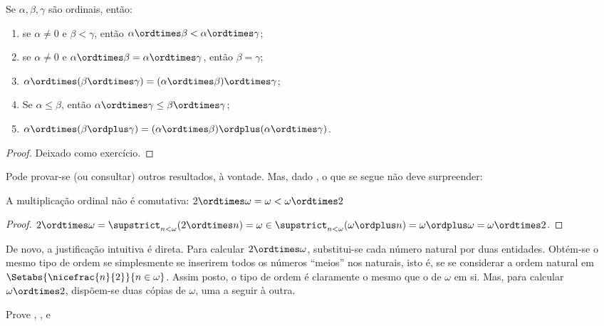 \documentclass[../../../include/open-logic-section]{subfiles}
\begin{document}
\begin{lem}
Se $\alpha, \beta, \gamma$ são ordinais, então:
\begin{enumerate}
	\item{} se $\alpha \neq 0$ e $\beta < \gamma$,
	então $\alpha \ordtimes \beta < \alpha \ordtimes \gamma$;
	\item{} se $\alpha \neq 0$ e $\alpha \ordtimes
	\beta = \alpha\ordtimes\gamma$, então $\beta = \gamma$;
	\item{}  $\alpha \ordtimes (\beta \ordtimes
	\gamma) = (\alpha \ordtimes \beta) \ordtimes \gamma$;
	\item{}  Se $\alpha \leq \beta$, então $\alpha
	\ordtimes \gamma \leq \beta \ordtimes \gamma$;
	\item{}  $\alpha \ordtimes (\beta \ordplus
	\gamma) = (\alpha \ordtimes \beta )\ordplus (\alpha\ordtimes
	\gamma)$.
\end{enumerate}
\end{lem}

\begin{proof}
Deixado como exercício.
\end{proof}

Pode provar-se (ou consultar) outros resultados, à vontade.
Mas, dado
, o
que se segue não deve surpreender:

\begin{prop}
A multiplicação ordinal não é comutativa: $2 \ordtimes \omega  =
\omega < \omega \ordtimes 2$
\end{prop}

\begin{proof}
$2 \ordtimes \omega = \supstrict_{n < \omega}(2\ordtimes  n) = \omega \in \supstrict_{n < \omega}(\omega \ordplus n) = \omega \ordplus \omega = \omega \ordtimes 2$.
\end{proof}
\noindent
De novo, a justificação intuitiva é direta. Para calcular $2
\ordtimes \omega$, substitui-se cada número natural por duas entidades.
Obtém-se o mesmo tipo de ordem se simplesmente se inserirem todos os
números ``meios'' nos naturais, isto é, se se considerar a
ordem natural em $\Setabs{\nicefrac{n}{2}}{n \in \omega}$. Assim posto, o tipo de ordem é claramente o mesmo que o de $\omega$
em si. Mas, para calcular $\omega \ordtimes 2$, dispõem-se duas
cópias de $\omega$, uma a seguir à outra.

\begin{prob}
Prove
,
,
e
\end{prob}
\end{document}
